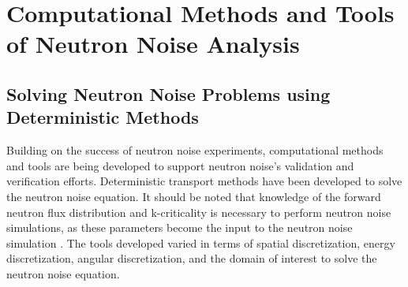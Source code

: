 \section{Computational Methods and Tools of Neutron Noise Analysis}

\subsection{Solving Neutron Noise Problems using Deterministic Methods}

Building on the success of neutron noise experiments, computational methods and tools are being developed to support neutron noise's validation and verification efforts. Deterministic transport methods have been developed to solve the neutron noise equation. It should be noted that knowledge of the forward neutron flux distribution and k-criticality is necessary to perform neutron noise simulations, as these parameters become the input to the neutron noise simulation \cite{demaziereDevelopment2D2group2004}. The tools developed varied in terms of spatial discretization, energy discretization, angular discretization, and the domain of interest to solve the neutron noise equation. 

